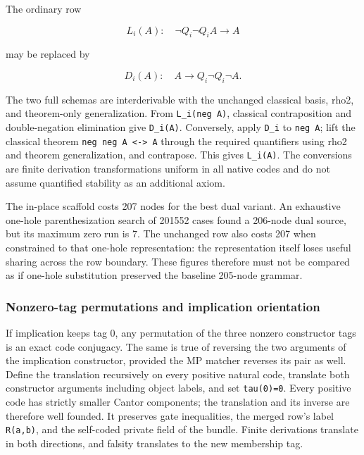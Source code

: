 \documentclass[
  11pt,
]{article}
\begin{document}
The ordinary row

\[
L_i(A):\quad \neg Q_i\neg Q_i A\to A
\]

may be replaced by

\[
D_i(A):\quad A\to Q_i\neg Q_i\neg A.
\]

The two full schemas are interderivable with the unchanged classical
basis, rho2, and theorem-only generalization. From
\texttt{L\_i(neg\ A)}, classical contraposition and double-negation
elimination give \texttt{D\_i(A)}. Conversely, apply \texttt{D\_i} to
\texttt{neg\ A}; lift the classical theorem
\texttt{neg\ neg\ A\ \textless{}-\textgreater{}\ A} through the required
quantifiers using rho2 and theorem generalization, and contrapose. This
gives \texttt{L\_i(A)}. The conversions are finite derivation
transformations uniform in all native codes and do not assume quantified
stability as an additional axiom.

The in-place scaffold costs 207 nodes for the best dual variant. An
exhaustive one-hole parenthesization search of 201552 cases found a
206-node dual source, but its maximum zero run is 7. The unchanged row
also costs 207 when constrained to that one-hole representation: the
representation itself loses useful sharing across the row boundary.
These figures therefore must not be compared as if one-hole substitution
preserved the baseline 205-node grammar.

\hypertarget{nonzero-tag-permutations-and-implication-orientation}{%
\subsubsection{Nonzero-tag permutations and implication
orientation}\label{nonzero-tag-permutations-and-implication-orientation}}

If implication keeps tag 0, any permutation of the three nonzero
constructor tags is an exact code conjugacy. The same is true of
reversing the two arguments of the implication constructor, provided the
MP matcher reverses its pair as well. Define the translation recursively
on every positive natural code, translate both constructor arguments
including object labels, and set \texttt{tau(0)=0}. Every positive code
has strictly smaller Cantor components; the translation and its inverse
are therefore well founded. It preserves gate inequalities, the merged
row's label \texttt{R(a,b)}, and the self-coded private field of the
bundle. Finite derivations translate in both directions, and falsity
translates to the new membership tag.
\end{document}
